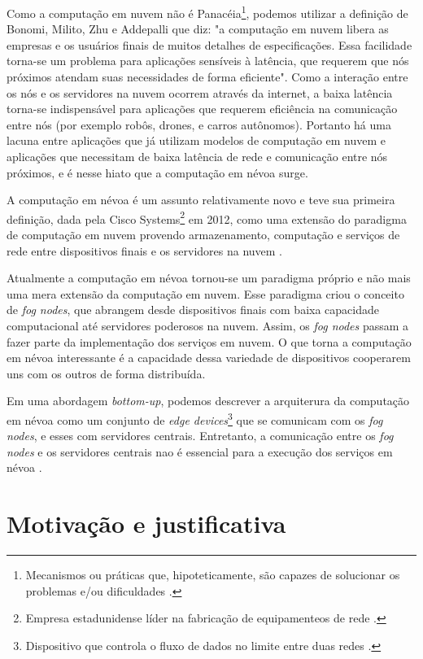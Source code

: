 Como a computação em nuvem não é Panacéia\footnote{Mecanismos ou práticas que, hipoteticamente, são capazes de solucionar os problemas e/ou dificuldades \cite{definition:panaceia}.}, podemos utilizar a definição de  Bonomi, Milito, Zhu e Addepalli \cite{Bonomi:2012} que diz: "a computação em nuvem libera as empresas e os usuários finais de muitos detalhes de especificações.
Essa facilidade torna-se um problema para aplicações sensíveis à latência, que requerem que nós próximos atendam suas necessidades de forma eficiente". 
Como a interação entre os nós e os servidores na nuvem ocorrem através da internet, a baixa latência torna-se indispensável para aplicações que requerem eficiência na comunicação entre nós (por exemplo robôs, drones, e carros autônomos).
Portanto há uma lacuna entre aplicações que já utilizam modelos de computação em nuvem e aplicações que necessitam de baixa latência de rede e comunicação entre nós próximos, e é nesse hiato que a computação em névoa surge.

A computação em névoa é um assunto relativamente novo e teve sua primeira definição, dada pela Cisco Systems\footnote{Empresa estadunidense líder na fabricação de equipamenteos de rede \cite{ciscoSystems}.} em 2012, como uma extensão do paradigma de computação em nuvem provendo armazenamento, computação e serviços de rede entre dispositivos finais e os servidores na nuvem \cite{DBLP:journals/corr/RomanLM16}. 

Atualmente a computação em névoa tornou-se um paradigma próprio e não mais uma mera extensão da computação em nuvem.
Esse paradigma criou o conceito de \textit{fog nodes}, que abrangem desde dispositivos finais com baixa capacidade computacional até servidores poderosos na nuvem.
Assim, os \textit{fog nodes} passam a fazer parte da implementação dos serviços em nuvem.
O que torna a computação em névoa interessante é a capacidade dessa variedade de dispositivos cooperarem uns com os outros de forma distribuída.

Em uma abordagem \textit{bottom-up}, podemos descrever a arquiterura da computação em névoa como um conjunto de \textit{edge devices}\footnote{Dispositivo que controla o fluxo de dados no limite entre duas redes \cite{edgeDevices}.} que se comunicam com os \textit{fog nodes}, e esses com servidores centrais.
Entretanto, a comunicação entre os \textit{fog nodes} e os servidores centrais nao é essencial para a execução dos serviços em névoa \cite{DBLP:journals/corr/RomanLM16}.


\section{Motivação e justificativa}

